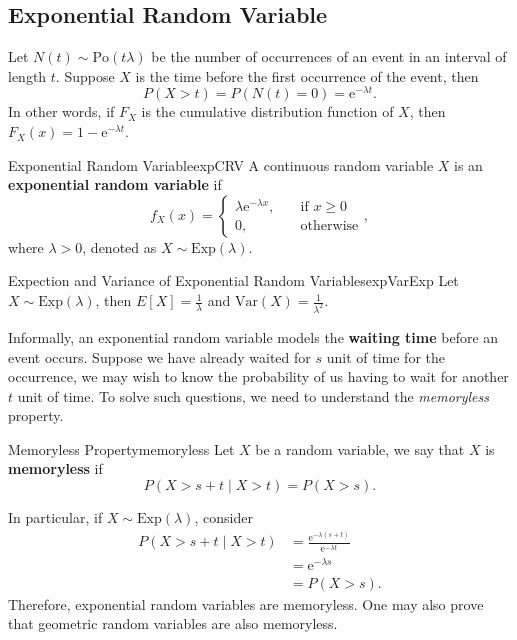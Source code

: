 \documentclass[math]{amznotes}
\theoremstyle{remark}
\begin{document}
\subsection{Exponential Random Variable}
Let $N(t) \sim \mathrm{Po}(t\lambda)$ be the number of occurrences of an event in an interval of length $t$. Suppose $X$ is the time before the first occurrence of the event, then
\begin{equation*}
    P(X > t) = P(N(t) = 0) = \mathrm{e}^{-\lambda t}.
\end{equation*}
In other words, if $F_X$ is the cumulative distribution function of $X$, then $F_X(x) = 1 - \mathrm{e}^{-\lambda t}$.
\begin{dfnbox}{Exponential Random Variable}{expCRV}
    A continuous random variable $X$ is an {\color{red} \textbf{exponential random variable}} if 
    \begin{equation*}
        f_X(x) = \begin{cases}
            \lambda\mathrm{e}^{-\lambda x}, & \quad\textrm{if } x \geq 0 \\
            0, & \quad\textrm{otherwise}
        \end{cases},
    \end{equation*}
    where $\lambda > 0$, denoted as $X \sim \mathrm{Exp}\left(\lambda\right)$.
\end{dfnbox}
\begin{thmbox}{Expection and Variance of Exponential Random Variables}{expVarExp}
    Let $X \sim \mathrm{Exp}(\lambda)$, then $E[X] = \frac{1}{\lambda}$ and $\mathrm{Var}(X) = \frac{1}{\lambda^2}$.
\end{thmbox}
Informally, an exponential random variable models the \textbf{waiting time} before an event occurs. Suppose we have already waited for $s$ unit of time for the occurrence, we may wish to know the probability of us having to wait for another $t$ unit of time. To solve such questions, we need to understand the \textit{memoryless} property.
\begin{dfnbox}{Memoryless Property}{memoryless}
    Let $X$ be a random variable, we say that $X$ is {\color{red} \textbf{memoryless}} if
    \begin{equation*}
        P(X > s + t \mid X > t) = P(X > s). 
    \end{equation*}
\end{dfnbox}
In particular, if $X \sim \mathrm{Exp}(\lambda)$, consider
\begin{align*}
    P(X > s + t \mid X > t) & = \frac{\mathrm{e}^{-\lambda(s + t)}}{\mathrm{e}^{-\lambda t}} \\
    & = \mathrm{e}^{-\lambda s} \\
    & = P(X > s).
\end{align*}
Therefore, exponential random variables are memoryless. One may also prove that geometric random variables are also memoryless.
\end{document}
